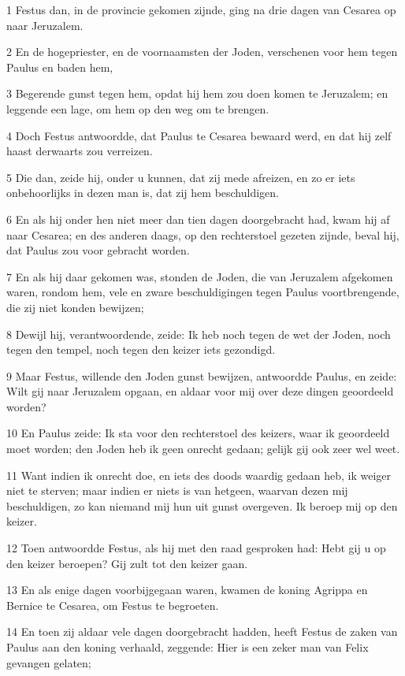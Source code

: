 \par 1 Festus dan, in de provincie gekomen zijnde, ging na drie dagen van Cesarea op naar Jeruzalem.
\par 2 En de hogepriester, en de voornaamsten der Joden, verschenen voor hem tegen Paulus en baden hem,
\par 3 Begerende gunst tegen hem, opdat hij hem zou doen komen te Jeruzalem; en leggende een lage, om hem op den weg om te brengen.
\par 4 Doch Festus antwoordde, dat Paulus te Cesarea bewaard werd, en dat hij zelf haast derwaarts zou verreizen.
\par 5 Die dan, zeide hij, onder u kunnen, dat zij mede afreizen, en zo er iets onbehoorlijks in dezen man is, dat zij hem beschuldigen.
\par 6 En als hij onder hen niet meer dan tien dagen doorgebracht had, kwam hij af naar Cesarea; en des anderen daags, op den rechterstoel gezeten zijnde, beval hij, dat Paulus zou voor gebracht worden.
\par 7 En als hij daar gekomen was, stonden de Joden, die van Jeruzalem afgekomen waren, rondom hem, vele en zware beschuldigingen tegen Paulus voortbrengende, die zij niet konden bewijzen;
\par 8 Dewijl hij, verantwoordende, zeide: Ik heb noch tegen de wet der Joden, noch tegen den tempel, noch tegen den keizer iets gezondigd.
\par 9 Maar Festus, willende den Joden gunst bewijzen, antwoordde Paulus, en zeide: Wilt gij naar Jeruzalem opgaan, en aldaar voor mij over deze dingen geoordeeld worden?
\par 10 En Paulus zeide: Ik sta voor den rechterstoel des keizers, waar ik geoordeeld moet worden; den Joden heb ik geen onrecht gedaan; gelijk gij ook zeer wel weet.
\par 11 Want indien ik onrecht doe, en iets des doods waardig gedaan heb, ik weiger niet te sterven; maar indien er niets is van hetgeen, waarvan dezen mij beschuldigen, zo kan niemand mij hun uit gunst overgeven. Ik beroep mij op den keizer.
\par 12 Toen antwoordde Festus, als hij met den raad gesproken had: Hebt gij u op den keizer beroepen? Gij zult tot den keizer gaan.
\par 13 En als enige dagen voorbijgegaan waren, kwamen de koning Agrippa en Bernice te Cesarea, om Festus te begroeten.
\par 14 En toen zij aldaar vele dagen doorgebracht hadden, heeft Festus de zaken van Paulus aan den koning verhaald, zeggende: Hier is een zeker man van Felix gevangen gelaten;
